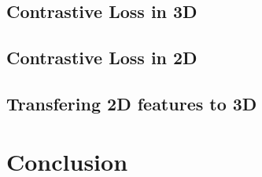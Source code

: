 \documentclass[10pt,twocolumn,letterpaper]{article}
\begin{document}
\subsection{Contrastive Loss in 3D}
\label{sec:results:3d}

\subsection{Contrastive Loss in 2D}
\label{sec:results:2d}

\subsection{Transfering 2D features to 3D}
\label{sec:results:2d3d}

\section{Conclusion}
\label{sec:conclusion}


{\small
    
    
}
\end{document}
